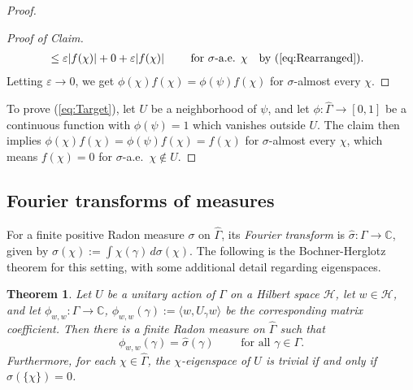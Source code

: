 \documentclass[12pt]{amsart} \usepackage{amsmath,centernot,amssymb,leftindex}
\newtheorem{theorem}{Theorem}
\numberwithin{theorem}{section}
\numberwithin{equation}{section}
\theoremstyle{definition}
\begin{document}
\begin{proof}
\begin{proof}[Proof of Claim]
\begin{align*}
			&\leq \varepsilon |f(\chi)| + 0 + \varepsilon|f(\chi)| \qquad \text{ for } \sigma\text{-a.e. } \chi && \text{by (\ref{eq:Rearranged})}.
		\end{align*}
		Letting $\varepsilon\to 0$, we get $\phi(\chi)f(\chi)=\phi(\psi)f(\chi)$ for $\sigma$-almost every $\chi$. \end{proof}
	To prove (\ref{eq:Target}), let $U$ be a neighborhood of $\psi$, and let $\phi:\widehat{\Gamma}\to [0,1]$ be a continuous function with $\phi(\psi)=1$ which vanishes outside $U$.  The claim then implies $\phi(\chi)f(\chi)=\phi(\psi)f(\chi)=f(\chi)$ for $\sigma$-almost every $\chi$, which means $f(\chi)=0$ for $\sigma$-a.e.~$\chi\notin U$.
\end{proof}




\subsection{Fourier transforms of measures} For a finite positive Radon measure $\sigma$ on $\widehat{\Gamma}$, its \emph{Fourier transform} is $\hat{\sigma}:\Gamma\to \mathbb C$, given by $\hat{\sigma}(\chi):=\int \chi(\gamma)\, d\sigma(\chi)$.  The following is the Bochner-Herglotz theorem for this setting,  with some additional detail regarding eigenspaces.
\begin{theorem}\label{th:BochnerHerglotz}
	Let $U$ be a unitary action of $\Gamma$ on a Hilbert space $\mathcal H$, let $w\in \mathcal H$, and let $\phi_{w,w}:\Gamma \to \mathbb C$,  $\phi_{w,w}(\gamma):=\langle w,U_{\gamma} w\rangle$ be the corresponding matrix coefficient.  Then there is a finite Radon measure on $\widehat{\Gamma}$ such that
	\begin{equation}\label{eq:Bochner}	
		\phi_{w,w}(\gamma) = \hat{\sigma}(\gamma) \qquad \text{ for all } \gamma \in \Gamma.
	\end{equation}
	Furthermore, for each $\chi\in \widehat{\Gamma}$, the $\chi$-eigenspace of $U$ is trivial if and only if $\sigma(\{\chi\})=0$.
\end{theorem}
\end{document}
